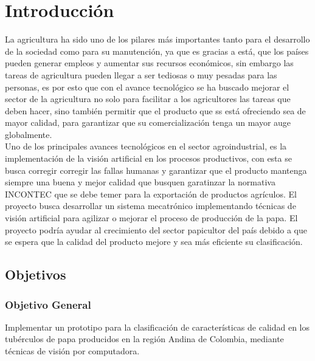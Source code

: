 \cleardoublepage %

\chapter{Introducción}

La agricultura ha sido uno de los pilares más importantes tanto para el desarrollo de la sociedad como para su manutención, ya que es gracias a está, que los países pueden generar empleos y aumentar sus recursos económicos, sin embargo las tareas de agricultura pueden llegar a ser tediosas o muy pesadas para las personas, es por esto que con el avance tecnológico se ha buscado mejorar el sector de la agricultura no solo para facilitar a los agricultores las tareas que deben hacer, sino también permitir que el producto que ss está ofreciendo sea de mayor calidad, para garantizar que su comercialización tenga un mayor auge globalmente.\\

Uno de los principales avances tecnológicos en el sector agroindustrial, es la implementación de la visión artificial en los procesos productivos, con esta se busca corregir corregir las fallas humanas y garantizar que el producto mantenga siempre una buena y mejor calidad que busquen garatinzar la normativa INCONTEC que se debe temer para la exportación de productos agrículos. El proyecto busca desarrollar un sistema mecatrónico implementando técnicas de visión artificial para agilizar o mejorar el proceso de producción de la papa. El proyecto podría ayudar al crecimiento del sector papicultor del país debido a que se espera que la calidad del producto mejore y sea más eficiente su clasificación.


\newpage
\section{Objetivos}

\subsection{Objetivo General}

Implementar un prototipo para la clasificación de características de calidad en los tubérculos de papa producidos en la región Andina de Colombia, mediante técnicas de visión por computadora.

